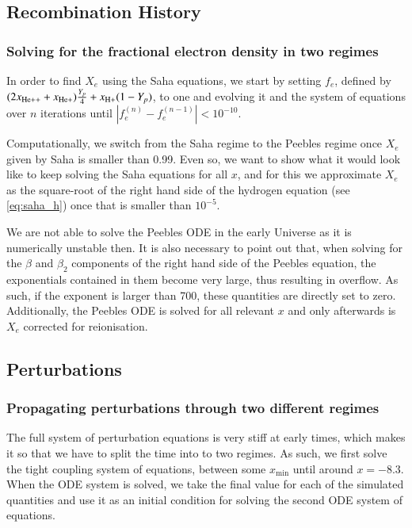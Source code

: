 \documentclass{aa}
\begin{document}
\subsection{Recombination History}

\subsubsection{Solving for the fractional electron density in two regimes}

In order to find $X_e$ using the Saha equations, we start by setting $f_e$, defined by $(2x_{\rm He++} + x_{\rm He+})\frac{Y_p}{4} + x_{\rm H+}(1-Y_p)$, to one and evolving it and the system of equations over $n$ iterations until $|f_e^{(n)} - f_e^{(n-1)}| < 10^{-10}$.

Computationally, we switch from the Saha regime to the Peebles regime once $X_e$ given by Saha is smaller than 0.99. Even so, we want to show what it would look like to keep solving the Saha equations for all $x$, and for this we approximate $X_e$ as the square-root of the right hand side of the hydrogen equation (see \eqref{eq:saha_h}) once that is smaller than $10^{-5}$.

We are not able to solve the Peebles ODE in the early Universe as it is numerically unstable then. It is also necessary to point out that, when solving for the $\beta$ and $\beta_2$ components of the right hand side of the Peebles equation, the exponentials contained in them become very large, thus resulting in overflow. As such, if the exponent is larger than 700, these quantities are directly set to zero. Additionally, the Peebles ODE is solved for all relevant $x$ and only afterwards is $X_e$ corrected for reionisation.

\subsection{Perturbations}

\subsubsection{Propagating perturbations through two different regimes}

The full system of perturbation equations is very stiff at early times, which makes it so that we have to split the time into to two regimes. As such, we first solve the tight coupling system of equations, between some $x_\textrm{min}$ until around $x = -8.3$. When the ODE system is solved, we take the final value for each of the simulated quantities and use it as an initial condition for solving the second ODE system of equations.
\end{document}
